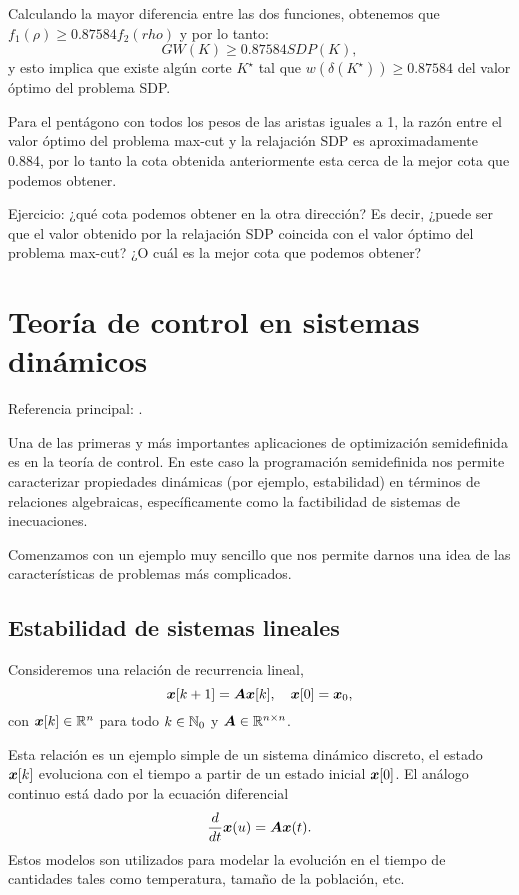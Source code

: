 Calculando la mayor diferencia entre las dos funciones, obtenemos que $f_1(\rho) \ge 0.87584 f_2(rho)$ y por lo tanto:
$$
GW(K) \ge 0.87584 SDP(K),
$$
y esto implica que existe algún corte $K^\star$ tal que $w(\delta(K^\star)) \ge 0.87584$ del valor óptimo del problema SDP.

Para el pentágono con todos los pesos de las aristas iguales a 1, la razón entre el valor óptimo del problema max-cut y la relajación SDP es aproximadamente 0.884, por lo tanto la cota obtenida anteriormente esta cerca de la mejor cota que podemos obtener.

Ejercicio: ¿qué cota podemos obtener en la otra dirección? Es decir, ¿puede ser que el valor obtenido por la relajación SDP coincida con el valor óptimo del problema max-cut? ¿O cuál es la mejor cota que podemos obtener?


\section{Teor\'ia de control en sistemas din\'amicos }

Referencia principal: \cite[Sección 2.2.1]{Blekherman2013}.

Una de las primeras y más importantes aplicaciones de optimización semidefinida es en la teoría de control.
En este caso la programación semidefinida nos permite caracterizar propiedades dinámicas (por ejemplo, estabilidad) en términos de relaciones algebraicas, específicamente como la factibilidad de sistemas de inecuaciones.

Comenzamos con un ejemplo muy sencillo que nos permite darnos una idea de las características de problemas más complicados.

\subsection{Estabilidad de sistemas lineales}

Consideremos una relación de recurrencia lineal,
$$
\bm{x}[k+1] = \bm{A} \bm{x}[k], \quad \bm{x}[0] = \bm{x}_0,
$$
con $\bm{x}[k] \in \mathbb{R}^n$ para todo $k \in \mathbb{N}_0$ y $\bm{A} \in \mathbb{R}^{n \times n}$.

Esta relación es un ejemplo simple de un sistema dinámico discreto, el estado $\bm{x}[k]$ evoluciona con el tiempo a partir de un estado inicial $\bm{x}[0]$. El análogo continuo está dado por la ecuación diferencial
$$
\frac{d}{dt}\bm{x}(u) = \bm{A}\bm{x}(t).
$$
Estos modelos son utilizados para modelar la evolución en el tiempo de cantidades tales como temperatura, tamaño de la población, etc.

